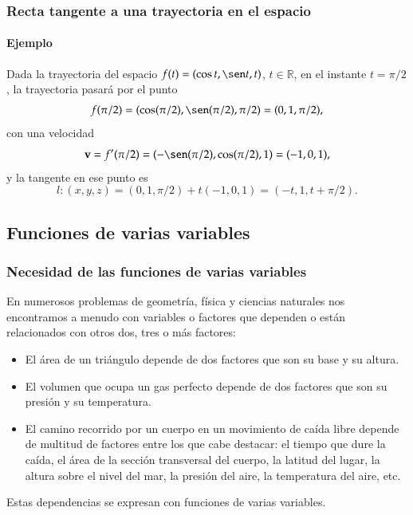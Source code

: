 \begin{frame}
	\frametitle{Recta tangente a una trayectoria en el espacio}
	\framesubtitle{Ejemplo}
	Dada la trayectoria del espacio $f(t)=(\cos t, \sen t, t)$, $t\in \mathbb{R}$, en el instante $t=\pi/2$, la trayectoria
	pasará por el punto
	\[
		f(\pi/2)=(\cos(\pi/2),\sen(\pi/2),\pi/2)=(0,1,\pi/2),
	\] con una velocidad
	\[
		\mathbf{v}=f'(\pi/2)=(-\sen(\pi/2),\cos(\pi/2), 1)=(-1,0,1),
	\] y la
	tangente en ese punto es
	\[
		l:(x,y,z)=(0,1,\pi/2)+t(-1,0,1) = (-t,1,t+\pi/2).
	\]
	\begin{center}
		\scalebox{0.8}{}
	\end{center}
\end{frame}



\subsection{Funciones de varias variables}
\begin{frame}
	\frametitle{Necesidad de las funciones de varias variables}
	En numerosos problemas de geometría, física y ciencias naturales nos encontramos a menudo con variables o factores que dependen o están relacionados con otros dos, tres o más factores:
	\begin{itemize}
		\item El área de un triángulo depende de dos factores que son su base y su altura.
		\item El volumen que ocupa un gas perfecto depende de dos factores que son su presión y su temperatura.
		\item El camino recorrido por un cuerpo en un movimiento de caída libre depende de multitud de factores entre los que cabe destacar: el tiempo que dure la caída, el área de la sección transversal del cuerpo, la latitud del lugar, la altura sobre el nivel del mar, la presión del aire, la temperatura del aire, etc.
	\end{itemize}
	Estas dependencias se expresan con funciones de varias variables.
\end{frame}



